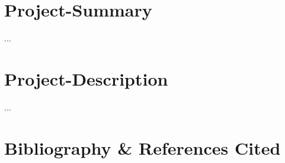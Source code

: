 \documentclass{grant-nsf}
\begin{document}
\chapter{Project-Summary}
...

\chapter{Project-Description}
...

\chapter{Bibliography \& References Cited}
\printbibliography[heading=none]
\end{document}
